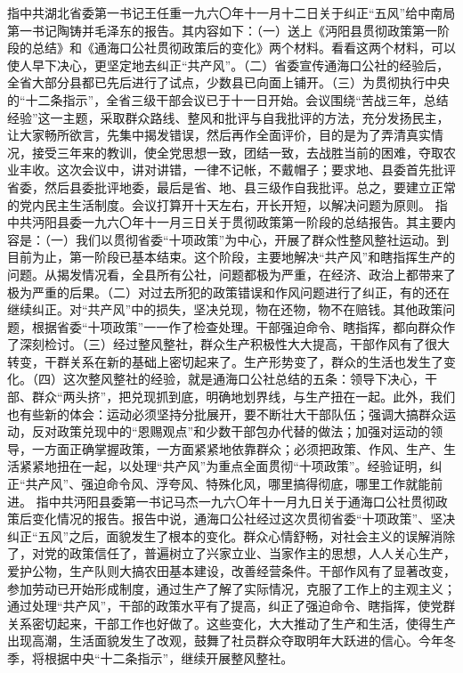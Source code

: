 \begin{maonote}
指中共湖北省委第一书记王任重一九六〇年十一月十二日关于纠正“五风”给中南局第一书记陶铸并毛泽东的报告。其内容如下：（一）送上《沔阳县贯彻政策第一阶段的总结》和《通海口公社贯彻政策后的变化》两个材料。看看这两个材料，可以使人早下决心，更坚定地去纠正“共产风”。（二）省委宣传通海口公社的经验后，全省大部分县都已先后进行了试点，少数县已向面上铺开。（三）为贯彻执行中央的“十二条指示”，全省三级干部会议已于十一日开始。会议围绕“苦战三年，总结经验”这一主题，采取群众路线、整风和批评与自我批评的方法，充分发扬民主，让大家畅所欲言，先集中揭发错误，然后再作全面评价，目的是为了弄清真实情况，接受三年来的教训，使全党思想一致，团结一致，去战胜当前的困难，夺取农业丰收。这次会议中，讲对讲错，一律不记帐，不戴帽子；要求地、县委首先批评省委，然后县委批评地委，最后是省、地、县三级作自我批评。总之，要建立正常的党内民主生活制度。会议打算开十天左右，开长开短，以解决问题为原则。
指中共沔阳县委一九六〇年十一月三日关于贯彻政策第一阶段的总结报告。其主要内容是：（一）我们以贯彻省委“十项政策”为中心，开展了群众性整风整社运动。到目前为止，第一阶段已基本结束。这个阶段，主要地解决“共产风”和瞎指挥生产的问题。从揭发情况看，全县所有公社，问题都极为严重，在经济、政治上都带来了极为严重的后果。（二）对过去所犯的政策错误和作风问题进行了纠正，有的还在继续纠正。对“共产风”中的损失，坚决兑现，物在还物，物不在赔钱。其他政策问题，根据省委“十项政策”一一作了检查处理。干部强迫命令、瞎指挥，都向群众作了深刻检讨。（三）经过整风整社，群众生产积极性大大提高，干部作风有了很大转变，干群关系在新的基础上密切起来了。生产形势变了，群众的生活也发生了变化。（四）这次整风整社的经验，就是通海口公社总结的五条：领导下决心，干部、群众“两头挤”，把兑现抓到底，明确地划界线，与生产扭在一起。此外，我们也有些新的体会：运动必须坚持分批展开，要不断壮大干部队伍；强调大搞群众运动，反对政策兑现中的“恩赐观点”和少数干部包办代替的做法；加强对运动的领导，一方面正确掌握政策，一方面紧紧地依靠群众；必须把政策、作风、生产、生活紧紧地扭在一起，以处理“共产风”为重点全面贯彻“十项政策”。经验证明，纠正“共产风”、强迫命令风、浮夸风、特殊化风，哪里搞得彻底，哪里工作就能前进。
指中共沔阳县委第一书记马杰一九六〇年十一月九日关于通海口公社贯彻政策后变化情况的报告。报告中说，通海口公社经过这次贯彻省委“十项政策”、坚决纠正“五风”之后，面貌发生了根本的变化。群众心情舒畅，对社会主义的误解消除了，对党的政策信任了，普遍树立了兴家立业、当家作主的思想，人人关心生产，爱护公物，生产队则大搞农田基本建设，改善经营条件。干部作风有了显著改变，参加劳动已开始形成制度，通过生产了解了实际情况，克服了工作上的主观主义；通过处理“共产风”，干部的政策水平有了提高，纠正了强迫命令、瞎指挥，使党群关系密切起来，干部工作也好做了。这些变化，大大推动了生产和生活，使得生产出现高潮，生活面貌发生了改观，鼓舞了社员群众夺取明年大跃进的信心。今年冬季，将根据中央“十二条指示”，继续开展整风整社。

\end{maonote}
